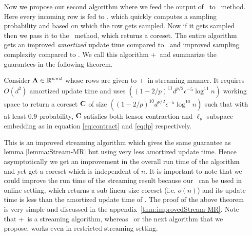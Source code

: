 Now we propose our second algorithm where we feed the output of \online~to \mrlw~method. Here every incoming row is fed to \online, which quickly computes a sampling probability and based on which the row gets sampled. Now if it gets sampled then we pass it to the \mrlw~method, which returns a coreset. The entire algorithm gets an improved {\em amortized} update time compared to \mrlw~and improved sampling complexity compared to \online. We call this algorithm \online+\mrlw~and summarize the guarantees in the following theorem.
\begin{theorem}{\label{thm:improvedStream-MR}}
 Consider $\mathbf{A} \in \mathbb{R}^{n \times d}$ whose rows are given to \online+\mrlw~in streaming manner. It requires $O(d^{2})$ amortized update time and uses $((1-2/p)^{11}d^{p/2}\epsilon^{-5}\log^{11} n)$ working space to return a coreset $\mathbf{C}$ of size $((1-2/p)^{10}d^{p/2}\epsilon^{-5}\log^{10} n)$ such that with at least 0.9 probability, $\mathbf{C}$ satisfies both tensor contraction and $\ell_{p}$ subspace embedding as in equation \eqref{eq:contract} and \eqref{eq:lp} respectively.
\end{theorem}
% 
This is an improved streaming algorithm which gives the same guarantee as lemma \ref{lemma:Stream-MR} but using very less amortized update time. Hence asymptotically we get an improvement in the overall run time of the algorithm and yet get a coreset which is independent of $n$.
It is important to note that we could improve the run time of the streaming result because our \online~can be used in online setting, which returns a sub-linear size coreset (i.e. $o(n)$) and its update time is less than the amortized update time of \mrlw. The proof of the above theorem is very simple and discussed in the appendix~\ref{thm:improvedStream-MR}. Note that \online+\mrlw~is a streaming algorithm, whereas \online~or the next algorithm that we propose, works even in restricted streaming setting. 
% 
